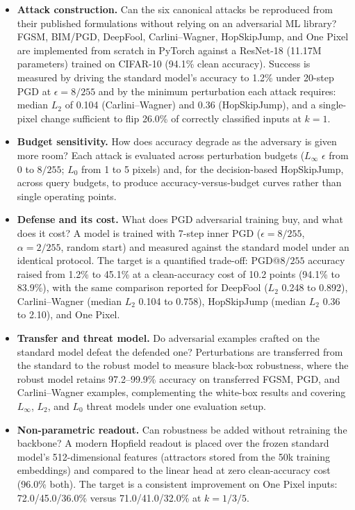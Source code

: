 \begin{itemize}
    \item \textbf{Attack construction.} Can the six canonical attacks be reproduced from their published formulations without relying on an adversarial ML library? FGSM, BIM/PGD, DeepFool, Carlini--Wagner, HopSkipJump, and One Pixel are implemented from scratch in PyTorch against a ResNet-18 (11.17M parameters) trained on CIFAR-10 (94.1\% clean accuracy). Success is measured by driving the standard model's accuracy to 1.2\% under 20-step PGD at $\epsilon=8/255$ and by the minimum perturbation each attack requires: median $L_2$ of 0.104 (Carlini--Wagner) and 0.36 (HopSkipJump), and a single-pixel change sufficient to flip 26.0\% of correctly classified inputs at $k{=}1$.

    \item \textbf{Budget sensitivity.} How does accuracy degrade as the adversary is given more room? Each attack is evaluated across perturbation budgets ($L_\infty$ $\epsilon$ from 0 to $8/255$; $L_0$ from 1 to 5 pixels) and, for the decision-based HopSkipJump, across query budgets, to produce accuracy-versus-budget curves rather than single operating points.

    \item \textbf{Defense and its cost.} What does PGD adversarial training buy, and what does it cost? A model is trained with 7-step inner PGD ($\epsilon=8/255$, $\alpha=2/255$, random start) and measured against the standard model under an identical protocol. The target is a quantified trade-off: PGD@$8/255$ accuracy raised from 1.2\% to 45.1\% at a clean-accuracy cost of 10.2 points (94.1\% to 83.9\%), with the same comparison reported for DeepFool ($L_2$ 0.248 to 0.892), Carlini--Wagner (median $L_2$ 0.104 to 0.758), HopSkipJump (median $L_2$ 0.36 to 2.10), and One Pixel.

    \item \textbf{Transfer and threat model.} Do adversarial examples crafted on the standard model defeat the defended one? Perturbations are transferred from the standard to the robust model to measure black-box robustness, where the robust model retains 97.2--99.9\% accuracy on transferred FGSM, PGD, and Carlini--Wagner examples, complementing the white-box results and covering $L_\infty$, $L_2$, and $L_0$ threat models under one evaluation setup.

    \item \textbf{Non-parametric readout.} Can robustness be added without retraining the backbone? A modern Hopfield readout is placed over the frozen standard model's 512-dimensional features (attractors stored from the 50k training embeddings) and compared to the linear head at zero clean-accuracy cost (96.0\% both). The target is a consistent improvement on One Pixel inputs: 72.0/45.0/36.0\% versus 71.0/41.0/32.0\% at $k{=}1/3/5$.
\end{itemize}

